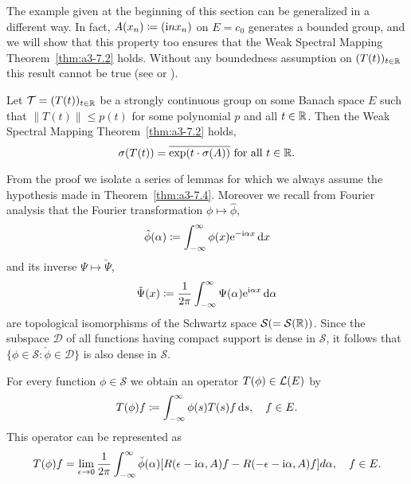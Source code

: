 The example given at the beginning of this section can be generalized in a different way.
In fact, $A(x_{n}) \coloneqq (\mathrm{i} nx_{n})$ on $E = c_{0}$ generates a bounded group, and we will show that this property too ensures that the Weak Spectral Mapping Theorem~\ref{thm:a3-7.2} holds.
Without any boundedness assumption on $(T(t))_{t\in\mathbb{R}}$ this result cannot be true (see \citet[Sec.23.16]{hillephillips:1957} or \citet{wolff:1981}).
\begin{theorem}\label{thm:a3-7.4}
Let $\mathcal{T} = (T(t))_{t\in\mathbb{R}}$ be a strongly continuous group on some Banach space $E$ such that $\|T(t)\| \leq p(t)$ for some polynomial $p$ and all $t \in \mathbb{R}$.
Then the Weak Spectral Mapping Theorem~\ref{thm:a3-7.2} holds, \ie 
\[
\sigma(T(t)) = \overline{\exp(t\cdot\sigma(A))} \text{ for all } t \in \mathbb{R} .
\]
\end{theorem}
From the proof we isolate a series of lemmas for which we always assume the hypothesis made in Theorem~\ref{thm:a3-7.4}.
Moreover we recall from Fourier analysis that the Fourier transformation $\phi \mapsto \hat{\phi}$,
\[
\hat{\phi}(\alpha) \coloneqq \int_{-\infty}^{\infty} \phi(x)\mathrm{e}^{-\mathrm{i}\alpha x} \mathop{}\!\mathrm{d}{x}
\]
and its inverse $\Psi \mapsto \check{\Psi}$,
\[
\check{\Psi}(x) \coloneqq \frac{1}{2\pi}\int_{-\infty}^{\infty}\Psi(\alpha)\mathrm{e}^{\mathrm{i}\alpha x} 				\mathop{}\!\mathrm{d}{\alpha}
\]
are topological isomorphisms of the Schwartz space $\mathcal{S} ( = \mathcal{S}(\mathbb{R}))$.
Since the subspace $\mathcal{D}$ of all functions having compact support is dense in $\mathcal{S}$, it follows that $\{\phi \in \mathcal{S} \colon \check{\phi} \in \mathcal{D}\}$ is also dense in $\mathcal{S}$.
\begin{lemma}\label{lem:a3-7.5}
For every function $\phi \in \mathcal{S}$ we obtain an operator $T(\phi) \in \mathcal{L}(E)$ by
\[
T(\phi)f \coloneqq \int_{-\infty}^{\infty} \phi(s)T(s)f \mathop{}\!\mathrm{d}{s}, \quad f \in E .
\]
This operator can be represented as
\begin{equation}\label{eq:a3-7.3}
T(\phi)f = \lim_{\epsilon\to 0} \frac{1}{2\pi}\int_{-\infty}^{\infty} \check{\phi}(\alpha)[R(\epsilon-\mathrm{i}\alpha,A)f - R(-\epsilon-\mathrm{i}\alpha,A)f] d\alpha, \quad f \in E .
\end{equation}
\end{lemma}
